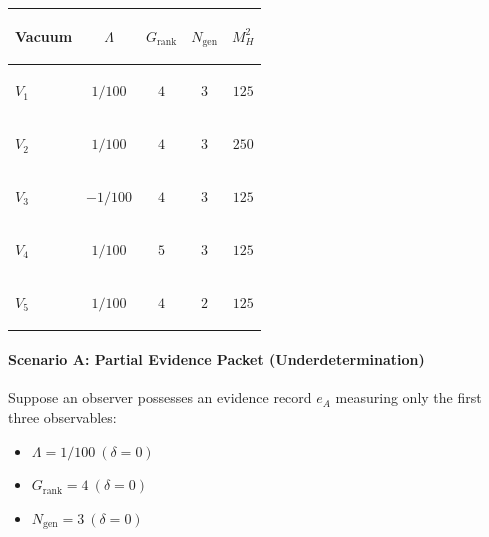 \documentclass[
  10pt,
]{article}
\begin{document}
\begin{longtable}[]{@{}lcccc@{}}
\toprule\noalign{}
Vacuum & \hypertarget{math-E0178-0255}{}{\(\Lambda\)} & \hypertarget{math-E0179-0256}{}{\(G_{\text{rank}}\)} & \hypertarget{math-E0180-0257}{}{\(N_{\text{gen}}\)} & \hypertarget{math-E0181-0258}{}{\(M_H^2\)} \\
\midrule\noalign{}
\endhead
\bottomrule\noalign{}
\endlastfoot
\textbf{\hypertarget{math-E0182-0259}{}{\(V_1\)}} & \hypertarget{math-E0183-0260}{}{\(1/100\)} & \hypertarget{math-E0184-0261}{}{\(4\)} & \hypertarget{math-E0185-0262}{}{\(3\)} & \hypertarget{math-E0186-0263}{}{\(125\)} \\
\textbf{\hypertarget{math-E0187-0264}{}{\(V_2\)}} & \hypertarget{math-E0183-0265}{}{\(1/100\)} & \hypertarget{math-E0184-0266}{}{\(4\)} & \hypertarget{math-E0185-0267}{}{\(3\)} & \hypertarget{math-E0188-0268}{}{\(250\)} \\
\textbf{\hypertarget{math-E0189-0269}{}{\(V_3\)}} & \hypertarget{math-E0190-0270}{}{\(-1/100\)} & \hypertarget{math-E0184-0271}{}{\(4\)} & \hypertarget{math-E0185-0272}{}{\(3\)} & \hypertarget{math-E0186-0273}{}{\(125\)} \\
\textbf{\hypertarget{math-E0191-0274}{}{\(V_4\)}} & \hypertarget{math-E0183-0275}{}{\(1/100\)} & \hypertarget{math-E0192-0276}{}{\(5\)} & \hypertarget{math-E0185-0277}{}{\(3\)} & \hypertarget{math-E0186-0278}{}{\(125\)} \\
\textbf{\hypertarget{math-E0193-0279}{}{\(V_5\)}} & \hypertarget{math-E0183-0280}{}{\(1/100\)} & \hypertarget{math-E0184-0281}{}{\(4\)} & \hypertarget{math-E0194-0282}{}{\(2\)} & \hypertarget{math-E0186-0283}{}{\(125\)} \\
\end{longtable}

\paragraph{Scenario A: Partial Evidence Packet (Underdetermination)}\label{scenario-a-partial-evidence-packet-underdetermination}

Suppose an observer possesses an evidence record \hypertarget{math-E0195-0284}{}{\(e_A\)} measuring only the first three observables:

\begin{itemize}
\item
  \hypertarget{math-E0196-0285}{}{\(\Lambda = 1/100 \ (\delta = 0)\)}
\item
  \hypertarget{math-E0197-0286}{}{\(G_{\text{rank}} = 4 \ (\delta = 0)\)}
\item
  \hypertarget{math-E0198-0287}{}{\(N_{\text{gen}} = 3 \ (\delta = 0)\)}
\end{itemize}
\end{document}
